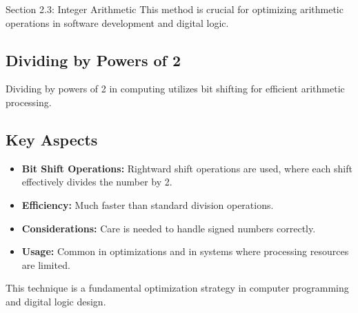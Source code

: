 \begin{notes}{Section 2.3: Integer Arithmetic}
    This method is crucial for optimizing arithmetic operations in software development and digital logic.

    \subsection*{Dividing by Powers of 2}

    Dividing by powers of 2 in computing utilizes bit shifting for efficient arithmetic processing.

    \subsection*{Key Aspects}
    
    \begin{itemize}
        \item \textbf{Bit Shift Operations:} Rightward shift operations are used, where each shift effectively divides the number by 2.
        \item \textbf{Efficiency:} Much faster than standard division operations.
        \item \textbf{Considerations:} Care is needed to handle signed numbers correctly.
        \item \textbf{Usage:} Common in optimizations and in systems where processing resources are limited.
    \end{itemize}
    
    This technique is a fundamental optimization strategy in computer programming and digital logic design.    
\end{notes}